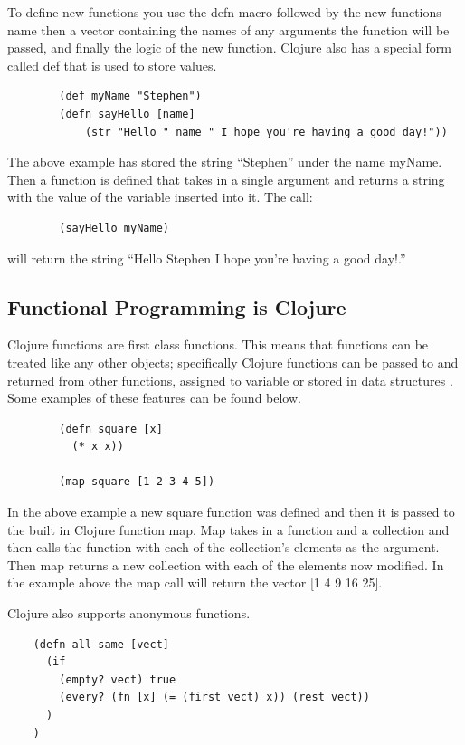 \documentclass[12pt]{article}
\begin{document}
	To define new functions you use the defn macro followed by the new functions name then a vector containing the names of any arguments the function will be passed, and finally the logic of the new function. Clojure also has a special form called def that is used to store values.
	
	\begin{verbatim}
		(def myName "Stephen")
		(defn sayHello [name]
			(str "Hello " name " I hope you're having a good day!"))
	\end{verbatim}
		The above example has stored the string ``Stephen'' under the name myName. Then a function is defined that takes in a single argument and returns a string with the value of the variable inserted into it. The call:
	\begin{verbatim}
		(sayHello myName)
	\end{verbatim}
	will return the string ``Hello Stephen I hope you're having a good day!.''
	
	\subsection{Functional Programming is Clojure}
	
	Clojure functions are first class functions. This means that functions can be treated like any other objects; specifically Clojure functions can be passed to and returned from other functions, assigned to variable or stored in data structures \cite{wiki:first-class}. Some examples of these features can be found below. 
	\begin{verbatim}
		(defn square [x] 
		  (* x x))
		
		(map square [1 2 3 4 5])
	\end{verbatim}
	
	In the above example a new square function was defined and then it is passed to the built in Clojure function map. Map takes in a function and a collection and then calls the function with each of the collection's elements as the argument. Then map returns a new collection with each of the elements now modified. In the example above the map call will return the vector [1 4 9 16 25].
	
	Clojure also supports anonymous functions. 
	
	\begin{verbatim}
	(defn all-same [vect]
      (if 
        (empty? vect) true
        (every? (fn [x] (= (first vect) x)) (rest vect)) 
      )
    )
	\end{verbatim}
	
\end{document}
